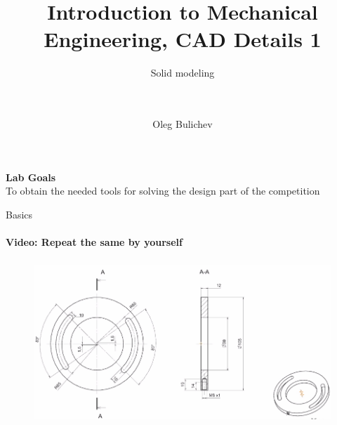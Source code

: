 \documentclass[aspectratio=169]{beamer}
\title[IME]{Introduction to Mechanical Engineering, CAD Details 1} %
\subtitle{ Solid modeling \\ \ \\ \ 
         } %
\author{Oleg Bulichev}
\newcommand{\fbckg}[1]{\usebackgroundtemplate{\texttt{[image: \#1]}}}%
\begin{document}
\setlength{\abovedisplayskip}{0pt}
\setlength{\belowdisplayskip}{0pt}
\setlength{\abovedisplayshortskip}{0pt}
\setlength{\belowdisplayshortskip}{0pt}

\fbckg{fibeamer/figs/title_page.png}

\fbckg{fibeamer/figs/common.png}

\note{\scriptsize \begin{itemize}
        \item \
    \end{itemize}}


\begin{frame}[c]{}
\framesubtitle{}
\centering \LARGE \textbf{Lab Goals} \\
To obtain the needed tools for solving the design part of the competition
\end{frame}

\begin{frame}[t]{Basics}
    \framesubtitle{Video: Repeat the same by yourself}
    \vspace{-0.6cm}
    \begin{figure}[H]
        \href{https://disk.yandex.ru/i/osJBruJtY83Crw}{
            \centering\includegraphics[height=6cm,width=1\textwidth,keepaspectratio]{resources/task_0.png}}
        \label{fig:1}
    \end{figure}
\end{frame}
\end{document}
